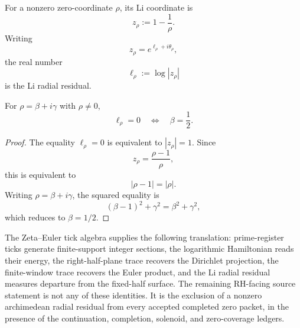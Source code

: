 \begin{definition}
\label{def:rh-zeta-li-radial-residual}
For a nonzero zero-coordinate $\rho$, its Li coordinate is
$$
z_{\rho}:=1-\frac1{\rho}.
$$
Writing
$$
z_{\rho}=e^{\ell_{\rho}+i\theta_{\rho}},
$$
the real number
$$
\ell_{\rho}:=\log|z_{\rho}|
$$
is the Li radial residual.
\end{definition}

\begin{theorem}
\label{thm:rh-zeta-li-radial-residual-fixed-half-test}
For $\rho=\beta+i\gamma$ with $\rho\ne0$,
$$
\ell_{\rho}=0
\quad\Longleftrightarrow\quad
\beta=\frac12.
$$
\end{theorem}

\begin{proof}
The equality $\ell_{\rho}=0$ is equivalent to $|z_{\rho}|=1$. Since
$$
z_{\rho}=\frac{\rho-1}{\rho},
$$
this is equivalent to
$$
|\rho-1|=|\rho|.
$$
Writing $\rho=\beta+i\gamma$, the squared equality is
$$
(\beta-1)^2+\gamma^2=\beta^2+\gamma^2,
$$
which reduces to $\beta=1/2$.
\end{proof}

\begin{principle}
\label{prin:rh-zeta-euler-tick-algebra-proof-boundary}
The Zeta--Euler tick algebra supplies the following translation:
prime-register ticks generate finite-support integer sections, the
logarithmic Hamiltonian reads their energy, the right-half-plane trace
recovers the Dirichlet projection, the finite-window trace recovers the
Euler product, and the Li radial residual measures departure from the
fixed-half surface. The remaining RH-facing source statement is not any
of these identities. It is the exclusion of a nonzero archimedean radial
residual from every accepted completed zero packet, in the presence of
the continuation, completion, solenoid, and zero-coverage ledgers.
\end{principle}
